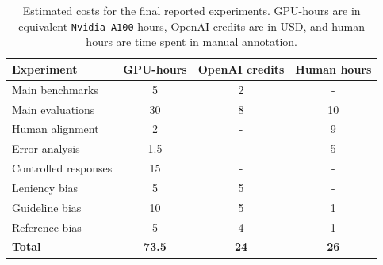 \onecolumn
\begin{table}[H]
    \centering
    \begin{tabular}{lccc}
        \toprule
        Experiment & GPU-hours & OpenAI credits & Human hours \\
        \midrule
        Main benchmarks & 5 & 2 & - \\
        Main evaluations & 30 & 8 & 10 \\
        Human alignment & 2 & - & 9 \\
        Error analysis & 1.5 & - & 5 \\
        Controlled responses & 15 & - & - \\
        Leniency bias & 5 & 5 & - \\
        Guideline bias & 10 & 5 & 1 \\
        Reference bias & 5 & 4 & 1 \\
        \midrule
        \textbf{Total} & \textbf{73.5} & \textbf{24} & \textbf{26} \\
        \bottomrule
    \end{tabular}
    \label{tab:experiment-costs}
         \captionsetup{skip=8pt} %
     \caption{Estimated costs for the final reported experiments. GPU-hours are in equivalent \texttt{Nvidia A100} hours, OpenAI credits are in USD, and human hours are time spent in manual annotation.}
\end{table}

